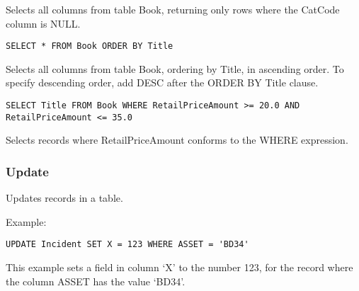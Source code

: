 Selects all columns from table Book, returning only rows where the CatCode column
is NULL.

\verb$SELECT * FROM Book ORDER BY Title$

Selects all columns from table Book, ordering by Title, in ascending order. To specify
descending order, add DESC after the ORDER BY Title clause.

\verb$SELECT Title FROM Book WHERE RetailPriceAmount >= 20.0 AND RetailPriceAmount <= 35.0$

Selects records where RetailPriceAmount conforms to the WHERE expression.

\subsubsection{Update}

Updates records in a table.

Example:

\verb$UPDATE Incident SET X = 123 WHERE ASSET = 'BD34'$

This example sets a field in column `X' to the number 123, for the record
where the column ASSET has the value `BD34'.



